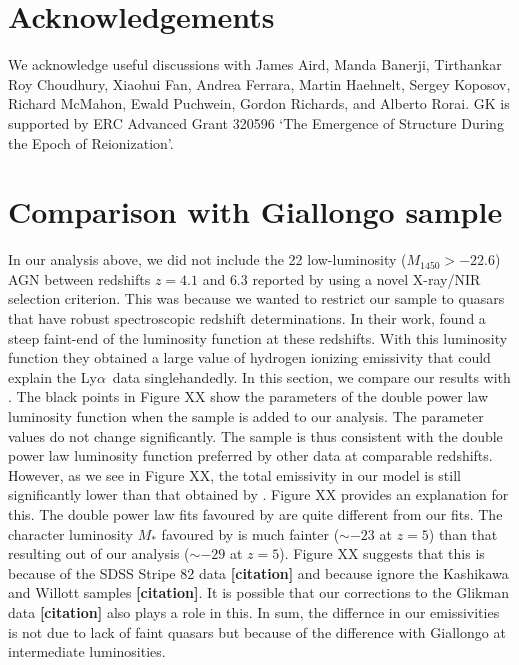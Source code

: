 \documentclass[a4paper,fleqn,usenatbib]{mnras}
\def\lya{Ly$\alpha$~}
\newcommand{\gk}[1]{{\bf \color{notecolor} [#1]}}
\begin{document}
\section*{Acknowledgements}

We acknowledge useful discussions with James Aird, Manda Banerji,
Tirthankar Roy Choudhury, Xiaohui Fan, Andrea Ferrara, Martin
Haehnelt, Sergey Koposov, Richard McMahon, Ewald Puchwein, Gordon
Richards, and Alberto Rorai.  GK is supported by ERC Advanced Grant
320596 `The Emergence of Structure During the Epoch of Reionization'.

\appendix

\section{Comparison with Giallongo sample}
\label{sec:conv}

In our analysis above, we did not include the 22 low-luminosity
($M_{1450}>-22.6$) AGN between redshifts $z=4.1$ and $6.3$ reported by
\citet{2015AA...578A..83G} using a novel X-ray/NIR selection
criterion.  This was because we wanted to restrict our sample to
quasars that have robust spectroscopic redshift determinations.  In
their work, \citet{2015AA...578A..83G} found a steep faint-end of the
luminosity function at these redshifts.  With this luminosity function
they obtained a large value of hydrogen ionizing emissivity that could
explain the \lya data singlehandedly.  In this section, we compare our
results with \citet{2015AA...578A..83G}.  The black points in Figure
XX show the parameters of the double power law luminosity function
when the \citet{2015AA...578A..83G} sample is added to our analysis.
The parameter values do not change significantly.  The
\citet{2015AA...578A..83G} sample is thus consistent with the double
power law luminosity function preferred by other data at comparable
redshifts.  However, as we see in Figure XX, the total emissivity in
our model is still significantly lower than that obtained by
\citet{2015AA...578A..83G}.  Figure XX provides an explanation for
this. The double power law fits favoured by \citet{2015AA...578A..83G}
are quite different from our fits.  The character luminosity $M_*$
favoured by \citet{2015AA...578A..83G} is much fainter ($\sim -23$ at
$z = 5$) than that resulting out of our analysis ($\sim -29$ at $z =
5$).  Figure XX suggests that this is because of the SDSS Stripe 82
data \gk{citation} and because \citet{2015AA...578A..83G} ignore the
Kashikawa and Willott samples \gk{citation}.  It is possible that our
corrections to the Glikman data \gk{citation} also plays a role in
this.  In sum, the differnce in our emissivities is not due to lack of
faint quasars but because of the difference with Giallongo at
intermediate luminosities.




\bsp
\label{lastpage}
\end{document}
